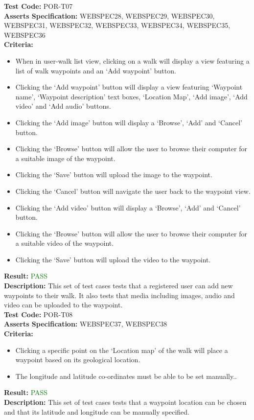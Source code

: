 \documentclass[11pt,a4paper]{report}
\begin{document}
\label{test:POR-T07}
\noindent\textbf{Test Code:} POR-T07\\
\textbf{Asserts Specification:} WEBSPEC28, WEBSPEC29, WEBSPEC30, WEBSPEC31, WEBSPEC32, WEBSPEC33, WEBSPEC34, WEBSPEC35, WEBSPEC36\\ 
\textbf{Criteria:} \begin{itemize}
                     \item When in user-walk list view, clicking on a walk will display a view featuring a list of walk waypoints and an `Add waypoint' button.
                     \item Clicking the `Add waypoint' button will display a view featuring `Waypoint name', `Waypoint description' text boxes, `Location Map', `Add image', `Add video' and `Add audio' buttons.
                     \item Clicking the `Add image' button will display a `Browse', `Add' and `Cancel' button.
                     \item Clicking the `Browse' button will allow the user to browse their computer for a suitable image of the waypoint.
                     \item Clicking the `Save' button will upload the image to the waypoint.
                     \item Clicking the `Cancel' button will navigate the user back to the waypoint view.
                     \item Clicking the `Add video' button will display a `Browse', `Add' and `Cancel' button.
                     \item Clicking the `Browse' button will allow the user to browse their computer for a suitable video of the waypoint.
                     \item Clicking the `Save' button will upload the video to the waypoint.
                   \end{itemize}  
\textbf{Result:} \textcolor{green}{PASS}\\ 
\textbf{Description:} This set of test cases tests that a registered user can add new waypoints to their walk. It also tests that media including images, audio and video can be uploaded to the waypoint. \\

\label{test:POR-T08}
\noindent\textbf{Test Code:} POR-T08\\
\textbf{Asserts Specification:} WEBSPEC37, WEBSPEC38\\ 
\textbf{Criteria:} \begin{itemize}
                     \item Clicking a specific point on the `Location map' of the walk will place a waypoint based on its geological location.
                     \item The longitude and latitude co-ordinates must be able to be set manually..
                   \end{itemize}  
\textbf{Result:} \textcolor{green}{PASS}\\
\textbf{Description:} This set of test cases tests that a waypoint location can be chosen and that its latitude and longitude can be manually specified. \\
\end{document}

